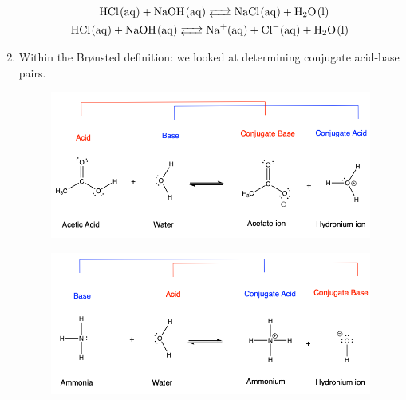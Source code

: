 \documentclass[12pt]{article}
\begin{document}
\begin{enumerate}
    \begin{align*}
    \ce{HCl(aq) + NaOH(aq) &<--> NaCl(aq) + H2O(l)} \\
    \ce{HCl(aq) + NaOH(aq) <-->& Na+(aq) + Cl-(aq) + H2O(l)} 
    \end{align*}

    \newpage 
    
    \item Within the Brønsted definition: we looked at determining conjugate acid-base pairs.

    \begin{figure}[h] 
	\begin{centering}
		\includegraphics[width=\textwidth,trim={0 0 0 0cm},clip]{Figures/Conj-A-B-pairs-1.png}
	\end{centering}
    \end{figure}    


     \begin{figure}[h] 
	\begin{centering}
		\includegraphics[width=\textwidth,trim={0 0 0 0cm},clip]{Figures/Conj-A-B-pairs-2.png}
	\end{centering}
    \end{figure}    
    
\end{enumerate}

\newpage
\end{document}
